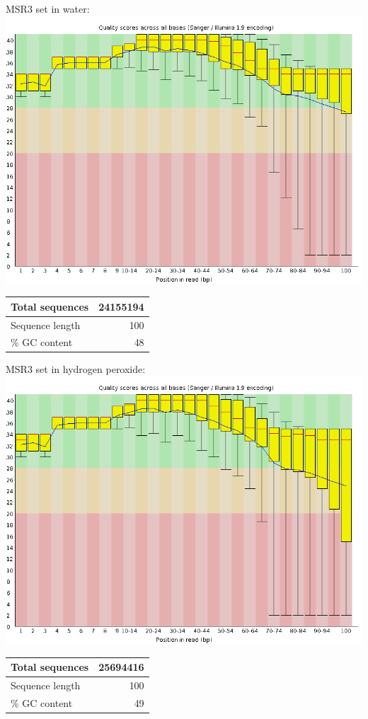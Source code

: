 \documentclass{article}
\begin{document}
\begin{center}
MSR3 set in water: \\
\includegraphics[scale=0.3]{msr3_h20_r1_basequal.png} \\
	\begin{tabular}{| l | r |}
	\hline
	Total sequences & 24155194 \\ \hline
	Sequence length & 100 \\ \hline
	\% GC content & 48 \\ \hline
	\end{tabular}

MSR3 set in hydrogen peroxide: \\
\includegraphics[scale=0.3]{msr3_h202_r1_basequal.png} \\
	\begin{tabular}{| l | r |}
	\hline
	Total sequences & 25694416 \\ \hline
	Sequence length & 100 \\ \hline
	\% GC content & 49 \\ \hline
	\end{tabular}
	

\end{center}
\end{document}
